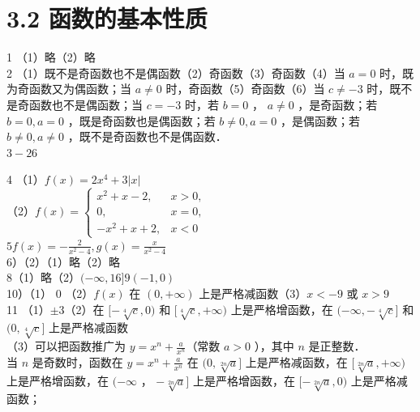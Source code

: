\documentclass[10pt]{article}
\begin{document}
\section*{3.2 函数的基本性质}
1 （1）略（2）略\\
2 （1）既不是奇函数也不是偶函数（2）奇函数（3）奇函数（4）当 \(a=0\) 时，既为奇函数又为偶函数；当 \(a \neq 0\) 时，奇函数（5）奇函数（6）当 \(c \neq-3\) 时，既不是奇函数也不是偶函数；当 \(c=-3\) 时，若 \(b=0\) ， \(a \neq 0\) ，是奇函数；若 \(b=0, a=0\) ，既是奇函数也是偶函数；若 \(b \neq 0, a=0\) ，是偶函数；若 \(b \neq 0, a \neq 0\) ，既不是奇函数也不是偶函数．\\
\(3-26\)

4 （1）\(f(x)=2 x^{4}+3|x|\)\\
（2）\(f(x)= \begin{cases}x^{2}+x-2, & x>0, \\ 0, & x=0, \\ -x^{2}+x+2, & x<0\end{cases}\)\\
\(5 f(x)=-\frac{2}{x^{2}-4}, g(x)=\frac{x}{x^{2}-4}\)\\
6）（2）（1）略（2）略\\
8（1）略（2）\((-\infty, 16] 9(-1,0)\)\\
10）（1） 0 （2）\(f(x)\) 在 \((0,+\infty)\) 上是严格减函数（3）\(x<-9\) 或 \(x>9\)\\
11 （1）\(\pm 3\)（2）在 \([-\sqrt[4]{c}, 0)\) 和 \([\sqrt[4]{c},+\infty)\) 上是严格增函数，在 \((-\infty,-\sqrt[4]{c}]\) 和 \((0, \sqrt[4]{c}]\) 上是严格减函数\\
（3）可以把函数推广为 \(y=x^{n}+\frac{a}{x^{n}}\)（常数 \(a>0\) ），其中 \(n\) 是正整数．\\
当 \(n\) 是奇数时，函数在 \(y=x^{n}+\frac{a}{x^{n}}\) 在 \((0, \sqrt[2 n]{a}]\) 上是严格减函数，在 \([\sqrt[2 n]{a},+\infty)\) 上是严格增函数，在 \((-\infty\) ， \(-\sqrt[2 n]{a}]\) 上是严格增函数，在 \([-\sqrt[2 n]{a}, 0)\) 上是严格减函数；
\end{document}
